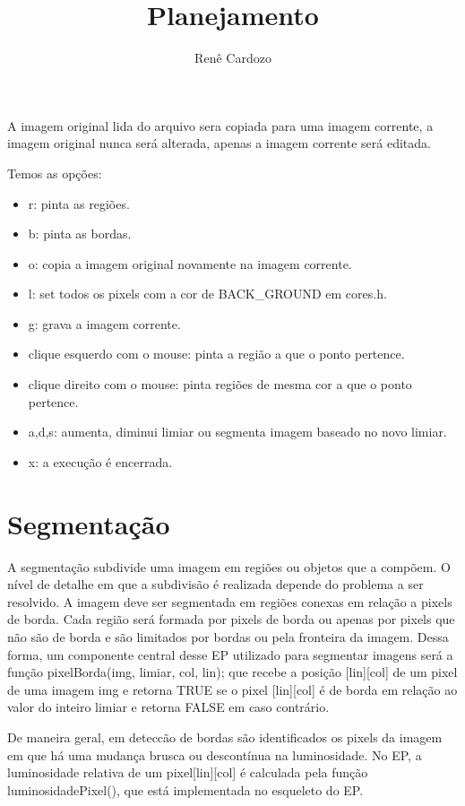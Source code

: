 \documentclass{article}
\title{Planejamento}
\author{Renê Cardozo}
\begin{document}
\maketitle
A imagem original lida do arquivo sera copiada para uma imagem corrente, a imagem original nunca será alterada, apenas a
imagem corrente será editada.

Temos as opções:
\begin{itemize}
\item r: pinta as regiões.
\item b: pinta as bordas.
\item o: copia a imagem original novamente na imagem corrente.
\item l: set todos os pixels com a cor de BACK_GROUND em cores.h.
\item g: grava a imagem corrente.
\item clique esquerdo com o mouse: pinta a região a que o ponto pertence.
\item clique direito com o mouse: pinta regiões de mesma cor a que o ponto pertence.
\item a,d,s: aumenta, diminui limiar ou segmenta imagem baseado no novo limiar.
\item x: a execução é encerrada.
\end{itemize}


\section{Segmentação} A segmentação subdivide uma imagem em regiões ou objetos que a compõem. O nível de detalhe em que
a subdivisão é realizada depende do problema a ser resolvido. A imagem  deve ser segmentada em regiões conexas em
relação a pixels de borda. Cada região será formada por pixels de borda ou apenas por pixels que não são de borda e são
limitados por bordas ou pela fronteira da imagem. Dessa forma, um componente central desse EP utilizado para segmentar
imagens será a função pixelBorda(img, limiar, col, lin); que recebe a posição [lin][col] de um pixel de uma imagem img e
retorna TRUE se o pixel [lin][col] é de borda em relação ao valor do inteiro limiar e retorna FALSE em caso contrário.


De maneira geral, em deteccão de bordas são identificados os pixels da imagem em que há uma mudança brusca ou
descontínua na luminosidade. No EP, a luminosidade relativa de um pixel[lin][col] é calculada pela função
luminosidadePixel(), que está implementada no esqueleto do EP.
\end{document}
